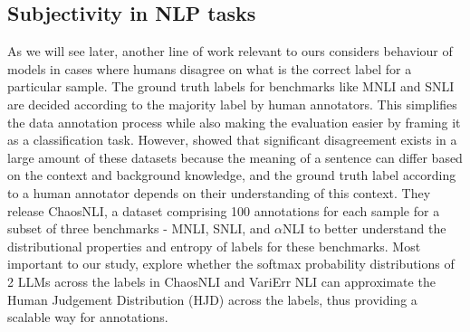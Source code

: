 \subsection{Subjectivity in NLP tasks}
\label{related:subjectivity}
As we will see later, another line of work relevant to ours considers behaviour of models in cases where humans disagree on what is the correct label for a particular sample. The ground truth labels for benchmarks like MNLI and SNLI are decided according to the majority label by human annotators. This simplifies the data annotation process while also making the evaluation easier by framing it as a classification task. However, \citet{nie-etal-2020-learn} showed that significant disagreement exists in a large amount of these datasets because the meaning of a sentence can differ based on the context and background knowledge, and the ground truth label according to a human annotator depends on their understanding of this context. They release ChaosNLI, a dataset comprising 100 annotations for each sample for a subset of three benchmarks - MNLI, SNLI, and $\alpha$NLI to better understand the distributional properties and entropy of labels for these benchmarks.
Most important to our study, \citet{chen2024seeingbig} explore whether the softmax probability distributions of 2 LLMs across the labels in ChaosNLI \citep{nie-etal-2020-learn} and VariErr NLI \citep{weber-genzel-etal-2024-varierr} can approximate the Human Judgement Distribution (HJD) across the labels, thus providing a scalable way for annotations.
